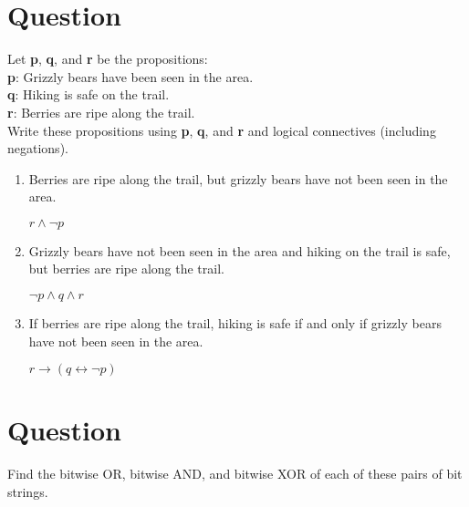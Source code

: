 \documentclass[a4paper,11pt]{article}
\begin{document}
\section{Question}
\label{sec:Question}
Let \textbf{p}, \textbf{q}, and \textbf{r} be the propositions:\\
\textbf{p}: Grizzly bears have been seen in the area.\\
\textbf{q}: Hiking is safe on the trail.\\
\textbf{r}: Berries are ripe along the trail.\\
Write these propositions using \textbf{p}, \textbf{q}, and \textbf{r} and logical connectives (including negations).

\begin{enumerate}[label=\alph*)]
  \item
  Berries are ripe along the trail, but grizzly bears have not been seen in the area.

  $r \wedge \neg p$
  \item
  Grizzly bears have not been seen in the area and hiking on the trail is safe, but berries are ripe along the trail.

  $\neg p \wedge q \wedge r$
  \item
  If berries are ripe along the trail, hiking is safe if and only if grizzly bears have not been seen in the area.

  $r \rightarrow (q \leftrightarrow \neg p)$
\end{enumerate}


\section{Question}
\label{sec:Question}
Find the bitwise OR, bitwise AND, and bitwise XOR of each of these pairs of bit strings.
\end{document}
